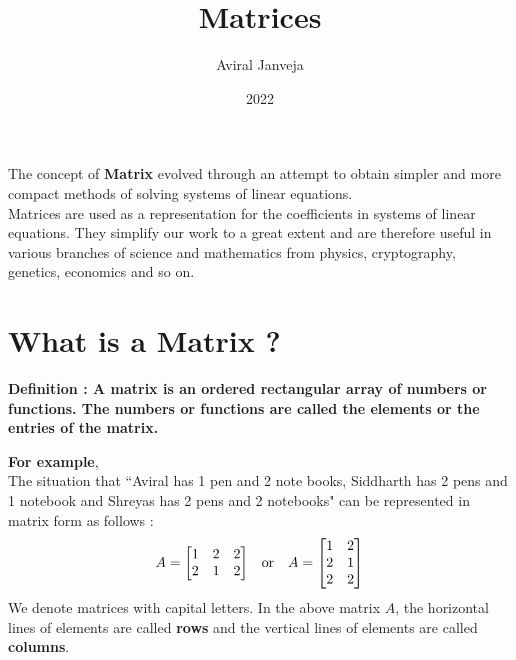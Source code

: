 \documentclass[12pt, letterpaper]{article}
\title{\textbf{\Huge Matrices}}
\author{Aviral Janveja}
\date{2022}
\begin{document}
\maketitle

The concept of \textbf{Matrix} evolved through an attempt to obtain simpler and more compact methods of solving systems of linear equations.\\
Matrices are used as a representation for the coefficients in systems of linear equations. They simplify our work to a great extent and are therefore useful in various branches of science and mathematics from physics, cryptography, genetics, economics and so on.


\section{What is a Matrix ?}
\begin{displayquote}
\textbf{ Definition : A matrix is an ordered rectangular array of numbers or functions. The numbers or functions are called the elements or the entries of the matrix.}
\end{displayquote}
\textbf{For example},\\
The situation that ``Aviral has 1 pen and 2 note books, Siddharth has 2 pens and 1 notebook and Shreyas has 2 pens and 2 notebooks" can be represented in matrix form as follows : 
\begin{displaymath}
\begin{split}
A = \begin{bmatrix}
1 & 2 & 2\\
2 & 1 & 2
\end{bmatrix}
\end{split}
\quad \textnormal{or} \quad
\begin{split}
    A = \begin{bmatrix}
1 & 2 \\
2 & 1 \\
2 & 2
\end{bmatrix}
\end{split}
\end{displaymath}
We denote matrices with capital letters. In the above matrix $A$, the horizontal lines of elements are called \textbf{rows} and the vertical lines of elements are called \textbf{columns}.
\end{document}
